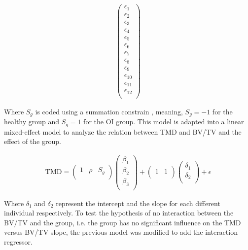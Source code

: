 \documentclass[a4paper,fleqn]{DC_ArtStyle}
\begin{document}
\begin{equation}
\begin{split}
\begin{pmatrix}
			\epsilon_{1} \\
			\epsilon_{2} \\
			\epsilon_{3} \\
			\epsilon_{4} \\
			\epsilon_{5} \\
			\epsilon_{6} \\
			\epsilon_{7} \\
			\epsilon_{8} \\
			\epsilon_{9} \\
			\epsilon_{10} \\
			\epsilon_{11} \\
			\epsilon_{12} \\
		\end{pmatrix}
	\end{split}
\end{equation}

Where $S_g$ is coded using a summation constrain \cite{Fox2016}, meaning, $S_g = -1$ for the healthy group and $S_g = 1$ for the OI group. This model is adapted into a linear mixed-effect model to analyze the relation between TMD and BV/TV and the effect of the group.

\begin{equation}
	\begin{split}
		\text{TMD} = \begin{pmatrix}
			1 & \rho & S_g \\
		\end{pmatrix} \begin{pmatrix}
			\beta_1 \\
			\beta_2 \\
			\beta_3 \\
		\end{pmatrix} + \begin{pmatrix}
			1 & 1 \\
		\end{pmatrix}\begin{pmatrix}
			\delta_1 \\
			\delta_2 \\
		\end{pmatrix} + \epsilon
	\end{split}
	\label{EqA14}
\end{equation}

Where $\delta_1$ and $\delta_2$ represent the intercept and the slope for each different individual respectively. To test the hypothesis of no interaction between the BV/TV and the group, i.e. the group has no significant influence on the TMD versus BV/TV slope, the previous model was modified to add the interaction regressor.
\end{document}
